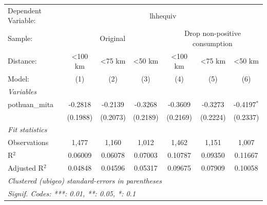 
\begingroup
\centering
\begin{tabular}{lcccccc}
   \tabularnewline \midrule \midrule
   Dependent Variable: & \multicolumn{6}{c}{lhhequiv}\\
   Sample: & \multicolumn{3}{c}{Original} & \multicolumn{3}{c}{Drop non-positive consumption} \\ 
   Distance:      & <100 km  & <75 km   & <50 km   & <100 km  & <75 km   & <50 km \\   
   Model:         & (1)      & (2)      & (3)      & (4)      & (5)      & (6)\\  
   \midrule
   \emph{Variables}\\
   pothuan\_mita  & -0.2818  & -0.2139  & -0.3268  & -0.3609  & -0.3273  & -0.4197$^{*}$\\   
                  & (0.1988) & (0.2073) & (0.2189) & (0.2169) & (0.2224) & (0.2337)\\   
   \midrule
   \emph{Fit statistics}\\
   Observations   & 1,477    & 1,160    & 1,012    & 1,462    & 1,151    & 1,007\\  
   R$^2$          & 0.06009  & 0.06078  & 0.07003  & 0.10787  & 0.09350  & 0.11667\\  
   Adjusted R$^2$ & 0.04848  & 0.04596  & 0.05317  & 0.09675  & 0.07909  & 0.10058\\  
   \midrule \midrule
   \multicolumn{7}{l}{\emph{Clustered (ubigeo) standard-errors in parentheses}}\\
   \multicolumn{7}{l}{\emph{Signif. Codes: ***: 0.01, **: 0.05, *: 0.1}}\\
\end{tabular}
\par\endgroup


